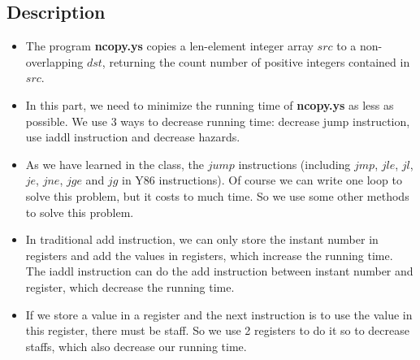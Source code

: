 \documentclass[12pt,a4paper]{article}
\theoremstyle{definition}
\numberwithin{equation}{section}
\numberwithin{figure}{section}
\begin{document}
\subsection{Description}
\begin{itemize}
	\item The program \textbf{ncopy.ys} copies a len-element integer array $src$ to a non-overlapping $dst$, returning the count number of positive integers contained in $src$.
	\item In this part, we need to minimize the running time of \textbf{ncopy.ys} as less as possible. We use 3 ways to decrease running time: decrease jump instruction, use iaddl instruction and decrease hazards.
	\item As we have learned in the class, the $jump$ instructions (including $jmp$, $jle$, $jl$, $je$, $jne$, $jge$ and $jg$ in Y86 instructions). Of course we can write one loop to solve this problem, but it costs to much time. So we use some other methods to solve this problem.
	\item In traditional add instruction, we can only store the instant number in registers and add the values in registers, which increase the running time. The iaddl instruction can do the add instruction between instant number and register, which decrease the running time.
	\item If we store a value in a register and the next instruction is to use the value in this register, there must be staff. So we use 2 registers to do it so to decrease staffs, which also decrease our running time.
\end{itemize}
\end{document}
